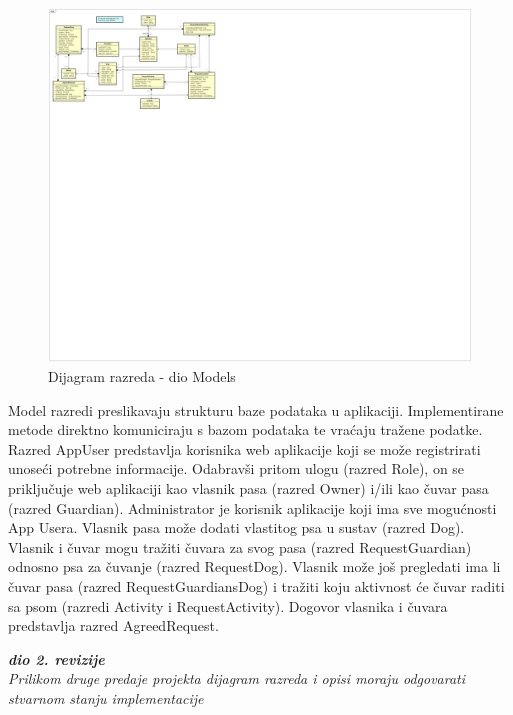 			\begin{figure}[htb]
				\centering
				\includegraphics[width=16cm]{slike/Class Diagram}
				\caption{Dijagram razreda - dio Models} 
				\label{fig:Class-Diagram}
			\end{figure}
		
			Model razredi preslikavaju strukturu baze podataka u aplikaciji. Implementirane metode direktno komuniciraju s bazom podataka te vraćaju tražene podatke.\\
			Razred AppUser predstavlja korisnika web aplikacije koji se može registrirati unoseći potrebne informacije. Odabravši pritom ulogu (razred Role), on se priključuje web aplikaciji kao vlasnik pasa (razred Owner) i/ili kao čuvar pasa (razred Guardian). Administrator je korisnik aplikacije koji ima sve mogućnosti App Usera. Vlasnik pasa može dodati vlastitog psa u sustav (razred Dog). Vlasnik i čuvar mogu tražiti čuvara za svog pasa (razred RequestGuardian) odnosno psa za čuvanje (razred RequestDog). Vlasnik može još pregledati ima li čuvar pasa (razred RequestGuardiansDog) i tražiti koju aktivnost će čuvar raditi sa psom (razredi Activity i RequestActivity). Dogovor vlasnika i čuvara predstavlja razred AgreedRequest.
			
			\eject
			
			\textbf{\textit{dio 2. revizije}}\\			
			
			\textit{Prilikom druge predaje projekta dijagram razreda i opisi moraju odgovarati stvarnom stanju implementacije}
			
